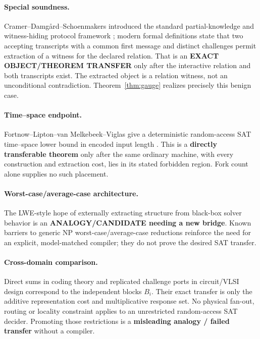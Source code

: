 \documentclass[11pt]{article}
\begin{document}
\paragraph{Special soundness.}
Cramer--Damg\aa rd--Schoenmakers introduced the standard partial-knowledge
and witness-hiding protocol framework \cite{CDS94}; modern formal definitions
state that two accepting transcripts with a common first message and distinct
challenges permit extraction of a witness for the declared relation.  That is
an \textbf{EXACT OBJECT/THEOREM TRANSFER} only after the interactive relation
and both transcripts exist.  The extracted object is a relation witness, not
an unconditional contradiction.  Theorem~\ref{thm:gauge} realizes precisely
this benign case.

\paragraph{Time--space endpoint.}
Fortnow--Lipton--van Melkebeek--Viglas give a deterministic random-access SAT
time--space lower bound in encoded input length \cite{FLMV05}.  This is a
\textbf{directly transferable theorem} only after the same ordinary machine,
with every construction and extraction cost, lies in its stated forbidden
region.  Fork count alone supplies no such placement.

\paragraph{Worst-case/average-case architecture.}
The LWE-style hope of externally extracting structure from black-box solver
behavior is an \textbf{ANALOGY/CANDIDATE needing a new bridge}.  Known barriers
to generic NP worst-case/average-case reductions reinforce the need for an
explicit, model-matched compiler; they do not prove the desired SAT transfer.

\paragraph{Cross-domain comparison.}
Direct sums in coding theory and replicated challenge ports in circuit/VLSI
design correspond to the independent blocks $B_i$.  Their exact transfer is
only the additive representation cost and multiplicative response set.  No
physical fan-out, routing or locality constraint applies to an unrestricted
random-access SAT decider.  Promoting those restrictions is a
\textbf{misleading analogy / failed transfer} without a compiler.
\end{document}
